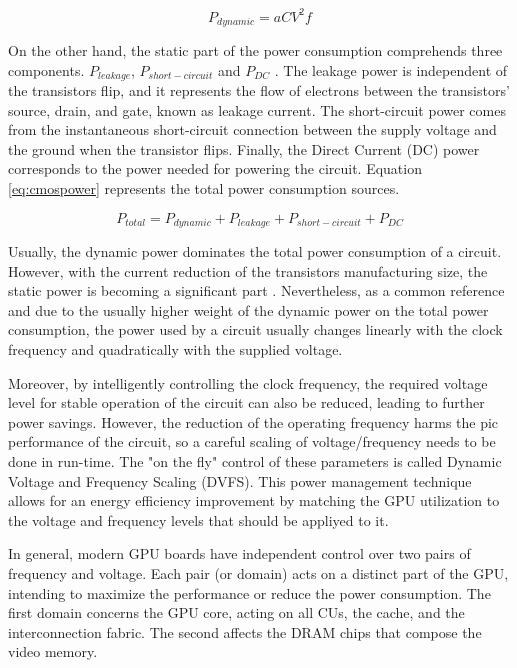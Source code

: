 \begin{equation}
    P_{dynamic} = aCV^2f
    \label{eq:dynpower}
\end{equation}


On the other hand, the static part of the power consumption comprehends three components. $P_{leakage}$, $P_{short-circuit}$ and $P_{DC}$ \cite{mei_survey_2016}. The leakage power is independent of the transistors flip, and it represents the flow of electrons between the transistors' source, drain, and gate, known as leakage current. The short-circuit power comes from the instantaneous short-circuit connection between the supply voltage and the ground when the transistor flips. Finally, the Direct Current (DC) power corresponds to the power needed for powering the circuit. Equation \ref{eq:cmospower} represents the total power consumption sources.

\begin{equation}
    P_{total} = P_{dynamic} + P_{leakage} + P_{short-circuit} + P_{DC}
    \label{eq:cmospower}
\end{equation}

Usually, the dynamic power dominates the total power consumption of a circuit. However, with the current reduction of the transistors manufacturing size, the static power is becoming a significant part \cite{s._hong_modeling_2012} \cite{hong_integrated_2010}. Nevertheless, as a common reference and due to the usually higher weight of the dynamic power on the total power consumption, the power used by a circuit usually changes linearly with the clock frequency and quadratically with the supplied voltage.

Moreover, by intelligently controlling the clock frequency, the required voltage level for stable operation of the circuit can also be reduced, leading to further power savings. However, the reduction of the operating frequency harms the pic performance of the circuit, so a careful scaling of voltage/frequency needs to be done in run-time. The "on the fly" control of these parameters is called Dynamic Voltage and Frequency Scaling (DVFS). This power management technique allows for an energy efficiency improvement by matching the GPU utilization to the voltage and frequency levels that should be appliyed to it.

In general, modern GPU boards have independent control over two pairs of frequency and voltage. Each pair (or domain) acts on a distinct part of the GPU, intending to maximize the performance or reduce the power consumption. The first domain concerns the GPU core, acting on all CUs, the cache, and the interconnection fabric. The second affects the DRAM chips that compose the video memory. 

